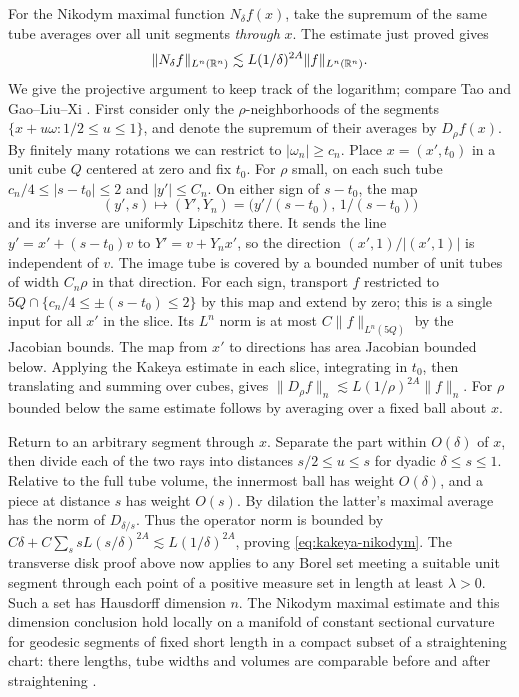 For the Nikodym maximal function \(N_\delta f(x)\), take the supremum
of the same tube averages over all unit segments \emph{through} \(x\).
The estimate just proved gives
\begin{equation}\label{eq:kakeya-nikodym}
 \|N_\delta f\|_{L^n(\mathbb R^n)}
             \lesssim L(1/\delta)^{2A}\|f\|_{L^n(\mathbb R^n)}.
\end{equation}
We give the projective argument to keep track of the logarithm;
compare Tao \cite[Theorem 4.10]{Tao1999} and Gao--Liu--Xi
\cite[\S2.2]{GaoLiuXi2025}. First consider only the
\(\rho\)-neighborhoods of the segments
\(\{x+u\omega:1/2\le u\le1\}\), and denote the supremum of their
averages by \(D_\rho f(x)\). By finitely many rotations we can
restrict to \(|\omega_n|\ge c_n\). Place \(x=(x',t_0)\) in a unit
cube \(Q\) centered at zero and fix \(t_0\). For \(\rho\) small, on each
such tube \(c_n/4\le|s-t_0|\le2\) and \(|y'|\le C_n\). On either
sign of \(s-t_0\), the map
\[
 (y',s)\longmapsto (Y',Y_n)
           =\big(y'/(s-t_0),\,1/(s-t_0)\big)
\]
and its inverse are uniformly Lipschitz there. It sends the line
\(y'=x'+(s-t_0)v\) to \(Y'=v+Y_n x'\), so the direction
\((x',1)/|(x',1)|\) is independent of \(v\). The image tube is
covered by a bounded number of unit tubes of width \(C_n\rho\) in
that direction. For each sign, transport \(f\) restricted to
\(5Q\cap\{c_n/4\le\pm(s-t_0)\le2\}\) by this map and extend by
zero; this is a single input for all \(x'\) in the slice. Its
\(L^n\) norm is at most \(C\|f\|_{L^n(5Q)}\) by the Jacobian
bounds. The map from \(x'\) to directions has area Jacobian bounded
below. Applying the Kakeya estimate in each slice, integrating in
\(t_0\), then translating and summing over
cubes, gives \(\|D_\rho f\|_n\lesssim L(1/\rho)^{2A}\|f\|_n\).
For \(\rho\) bounded below the same estimate follows by averaging
over a fixed ball about \(x\).

Return to an arbitrary segment through \(x\). Separate the part
within \(O(\delta)\) of \(x\), then divide each of the two rays into
distances \(s/2\le u\le s\) for dyadic \(\delta\le s\le1\).
Relative to the full tube volume, the innermost ball has weight
\(O(\delta)\), and a piece at distance \(s\) has weight \(O(s)\).
By dilation the latter's maximal average has the norm of
\(D_{\delta/s}\). Thus the operator norm is bounded by
\(\displaystyle C\delta+C\sum_s s L(s/\delta)^{2A}
\lesssim L(1/\delta)^{2A}\), proving \eqref{eq:kakeya-nikodym}.
The transverse disk proof above now applies to any Borel set meeting
a suitable unit segment through each point of a positive measure
set in length at least \(\lambda>0\). Such a set has Hausdorff
dimension \(n\). The Nikodym maximal estimate and this dimension conclusion
hold locally on a manifold of
constant sectional curvature for geodesic segments of fixed short
length in a compact subset of a straightening chart: there lengths,
tube widths and volumes are comparable before and after straightening
\cite[Proposition 2.3]{GaoLiuXi2025}.

